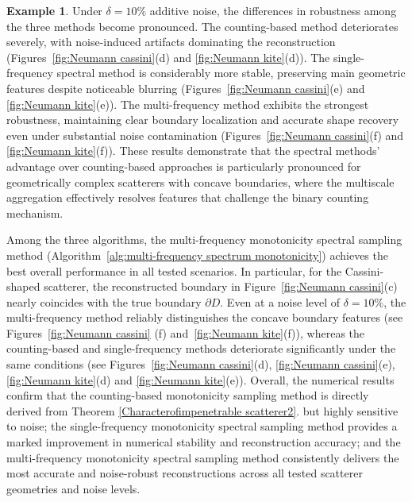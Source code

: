\documentclass[11pt,reqno,twoside]{amsart}
\theoremstyle{definition}
\newtheorem{example}{Example}[section]
\theoremstyle{remark}
\numberwithin{equation}{section}
\begin{document}
\begin{example}
Under $\delta = 10\%$ additive noise, the differences in robustness among the three methods become pronounced. The counting-based method deteriorates severely, with noise-induced artifacts dominating the reconstruction (Figures~\ref{fig:Neumann cassini}(d) and \ref{fig:Neumann kite}(d)). The single-frequency spectral method is considerably more stable, preserving main geometric features despite noticeable blurring (Figures~\ref{fig:Neumann cassini}(e) and \ref{fig:Neumann kite}(e)). The multi-frequency method exhibits the strongest robustness, maintaining clear boundary localization and accurate shape recovery even under substantial noise contamination (Figures~\ref{fig:Neumann cassini}(f) and \ref{fig:Neumann kite}(f)). These results demonstrate that the spectral methods' advantage over counting-based approaches is particularly pronounced for geometrically complex scatterers with concave boundaries, where the multiscale aggregation effectively resolves features that challenge the binary counting mechanism.

Among the three algorithms, the multi-frequency monotonicity spectral sampling method (Algorithm~\ref{alg:multi-frequency spectrum monotonicity}) achieves the best overall performance in all tested scenarios. In particular, for the Cassini-shaped scatterer, the reconstructed boundary in Figure~\ref{fig:Neumann cassini}(c) nearly coincides with the true boundary $\partial D$. Even at a noise level of $\delta = 10\%$, the multi-frequency method reliably distinguishes the concave boundary features (see Figures~\ref{fig:Neumann cassini} (f) and~\ref{fig:Neumann kite}(f)), whereas the counting-based and single-frequency methods deteriorate significantly under the same conditions (see Figures~\ref{fig:Neumann cassini}(d), \ref{fig:Neumann cassini}(e), \ref{fig:Neumann kite}(d) and \ref{fig:Neumann kite}(e)). Overall, the numerical results confirm that the counting-based monotonicity sampling method is directly derived from Theorem \ref{Characterofimpenetrable scatterer2}. but highly sensitive to noise; the single-frequency monotonicity spectral sampling method provides a marked improvement in numerical stability and reconstruction accuracy; and the multi-frequency monotonicity spectral sampling method consistently delivers the most accurate and noise-robust reconstructions across all tested scatterer geometries and noise levels.
\end{example}
\end{document}
